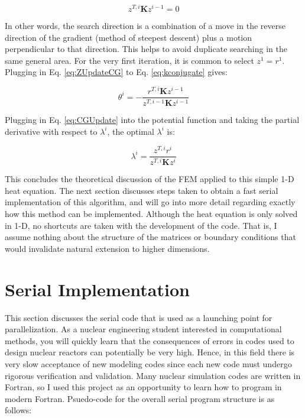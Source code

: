 \documentclass[10pt]{article}
\newcommand{\beq}{\begin{equation}}
\newcommand{\eeq}{\end{equation}}
\begin{document}
\beq
\label{eq:kconjugate}
z^{T,i}\textbf{K}z^{i-1}=0
\eeq

In other words, the search direction is a combination of a move in the reverse direction of the gradient (method of steepest descent) plus a motion perpendicular to that direction. This helps to avoid duplicate searching in the same general area. For the very first iteration, it is common to select \(z^1=r^1\). Plugging in Eq. \eqref{eq:ZUpdateCG} to Eq. \eqref{eq:kconjugate} gives:

\beq
\theta^i=-\frac{r^{T,i}\textbf{K}z^{i-1}}{z^{T,i-1}\textbf{K}z^{i-1}}
\eeq

Plugging in Eq. \eqref{eq:CGUpdate} into the potential function and taking the partial derivative with respect to \(\lambda^i\), the optimal \(\lambda^i\) is:

\beq
\label{eq:UpdateCG}
\lambda^i=\frac{z^{T,i}r^i}{z^{T,i}\textbf{K}z^i}
\eeq

This concludes the theoretical discussion of the FEM applied to this simple 1-D heat equation. The next section discusses steps taken to obtain a fast serial implementation of this algorithm, and will go into more detail regarding exactly how this method can be implemented. Although the heat equation is only solved in 1-D, no shortcuts are taken with the development of the code. That is, I assume nothing about the structure of the matrices or boundary conditions that would invalidate natural extension to higher dimensions.

\section{Serial Implementation}

This section discusses the serial code that is used as a launching point for parallelization. As a nuclear engineering student interested in computational methods, you will quickly learn that the consequences of errors in codes used to design nuclear reactors can potentially be very high. Hence, in this field there is very slow acceptance of new modeling codes since each new code must undergo rigorous verification and validation. Many nuclear simulation codes are written in Fortran, so I used this project as an opportunity to learn how to program in modern Fortran. Psuedo-code for the overall serial program structure is as follows:
\end{document}
